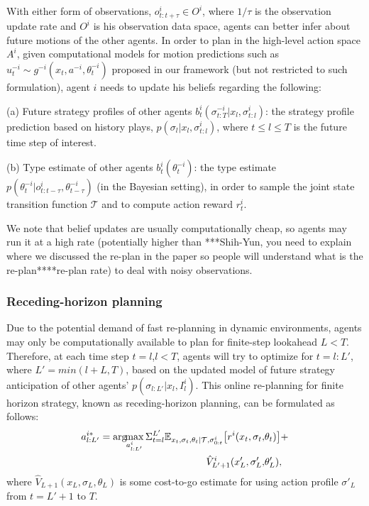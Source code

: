 \documentclass[letterpaper, 10 pt, conference]{ieeeconf}  %
\newcommand{\argmax}{\arg\!\!\max}
\begin{document}
With either form of observations, $o^i_{t:t+\tau} \in O^i$, where $1/\tau$ is the 
observation  
update rate and $O^i$ is his observation data space, agents can better infer about 
future motions of the other agents. In order to plan in the high-level action space $A^i$, given computational models for motion 
predictions such as $u^{-i}_t \sim g^{-i}(x_t,a^{-i},\theta^{-i}_t)$ proposed in our framework (but not restricted to such formulation), agent $i$ needs to update his beliefs regarding the following:

(a) Future strategy profiles of other agents $b^i_t(\sigma^{-i}_{t:T}|x_l,\sigma^i_{t:l})$: 
the strategy profile prediction based on history plays, $p(\sigma_l|x_l,\sigma^i_{t:l})$, 
where $t\leq l\leq T$ is the future time step of 
interest.

(b) Type estimate of other agents $b^i_t(\theta_t^{-i})$: 
the type estimate $p(\theta^{-i}_t|o^i_{t:t-\tau},\theta^{-i}_{t-\tau})$ (in 
the Bayesian setting), in order to sample the joint state transition function 
$\mathcal{T}$ and to compute action reward $r^i_t$.


We note that belief updates are usually computationally cheap, so agents may run it at a high rate (potentially higher than ***Shih-Yun, you need to explain where we discussed the re-plan in the paper so people will understand what is the re-plan****re-plan rate) to deal with noisy 
observations.
 
\subsubsection{Receding-horizon planning}\label{sec:receding}
Due to the potential demand of fast re-planning in dynamic environments, agents may only be computationally available to plan for finite-step lookahead $L<T$. Therefore, at each time step $t=l$,$l<T$, agents will try to optimize for $t=l:L'$, where $L'=min(l+L,T)$, based on the updated model of future strategy anticipation of other agents' $p(\sigma_{l:L'}|x_l,I^i_l)$. This online re-planning 
for finite horizon strategy, known as receding-horizon planning, can be formulated as follows:
\begin{equation}
  \begin{aligned}
  a^{i*}_{l:L'} = \argmax_{a^i_{l:L'}} 
  \Sigma_{t=l}^{L'} 
  \mathbb{E}_{x_t,\sigma_{t},\theta_t|\mathcal{T},\sigma^i_{0:t}} \big{[}
    r^i(x_t,\sigma_t,&\theta_t)\big{]}+ \\
    \hat{V}^i_{L'+1}(x_L',\sigma_L',&\theta_L'), 
  \end{aligned}
  \end{equation}
where $\hat{V}_{L+1}(x_L,\sigma_L,\theta_L)$ is some cost-to-go estimate for using action profile $\sigma'_L$ from $t=L'+1$ to $T$.
\end{document}

